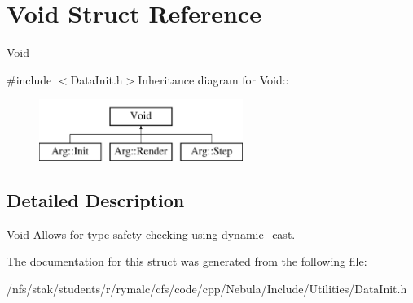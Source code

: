 \hypertarget{structVoid}{
\section{Void Struct Reference}
\label{structVoid}
}


Void  


{\ttfamily \#include $<$DataInit.h$>$}Inheritance diagram for Void::\begin{figure}[H]
\begin{center}
\leavevmode
\includegraphics[height=2cm]{structVoid}
\end{center}
\end{figure}


\subsection{Detailed Description}
Void Allows for type safety-\/checking using dynamic\_\-cast. 

The documentation for this struct was generated from the following file:\begin{DoxyCompactItemize}
\item 
/nfs/stak/students/r/rymalc/cfs/code/cpp/Nebula/Include/Utilities/DataInit.h\end{DoxyCompactItemize}
